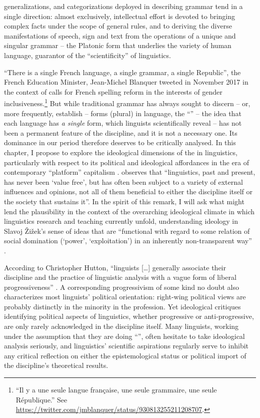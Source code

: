 \documentclass[output=paper]{langscibook}
\begin{document}
generalizations, and categorizations deployed in describing grammar tend in a single direction: almost exclusively, intellectual effort is devoted to bringing complex facts under the scope of general rules, and to deriving the diverse manifestations of speech, sign and text from the operations of a unique and singular grammar -- the Platonic form that underlies the variety of human language, guarantor of the ``scientificity'' of linguistics.

``There is a single French language, a single grammar, a single Republic'', the French Education Minister, Jean-Michel Blanquer tweeted in November 2017 in the context of calls for French spelling reform in the interests of gender inclusiveness.\footnote{``Il y a une seule langue française, une seule grammaire, une seule République.'' See \url{https://twitter.com/jmblanquer/status/930813255211208707}.} But while traditional grammar has always sought to discern -- or, more frequently, establish -- forms (plural) in language, the ``'' -- the idea that each language has \emph{a single} form, which linguists scientifically reveal -- has not been a permanent feature of the discipline, and it is not a necessary one. Its dominance in our period therefore deserves to be critically analysed. In this chapter, I propose to explore the ideological dimensions of the  in linguistics, particularly with respect to its political and ideological affordances in the era of contemporary ``platform'' capitalism \citep{Srnicek2017}. \citet[19]{Koerner2000} observes that ``linguistics, past and present, has never been `value free', but has often been subject to a variety of external influences and opinions, not all of them beneficial to either the discipline itself or the society that sustains it''. In the spirit of this remark, I will ask what might lend the  plausibility in the context of the overarching ideological climate in which linguistics research and teaching currently unfold, understanding ideology in Slavoj Žižek's sense of ideas that are ``functional with regard to some relation of social domination (`power', `exploitation') in an inherently non-transparent way'' \citep[8]{Zizek1994}.

According to Christopher Hutton, ``linguists […] generally associate their discipline and the practice of linguistic analysis with a vague form of liberal progressiveness'' \citep[295]{Hutton2001}. A corresponding progressivism of some kind no doubt also characterizes most linguists' political orientation: right-wing political views are probably distinctly in the minority in the profession. Yet ideological critiques identifying political aspects of linguistics, whether progressive or anti-progressive, are only rarely acknowledged in the discipline itself. Many linguists, working under the assumption that they are doing ``'', often hesitate to take ideological analysis seriously, and linguistics' scientific aspirations regularly serve to inhibit any critical reflection on either the epistemological status or political import of the discipline's theoretical results.
\end{document}
